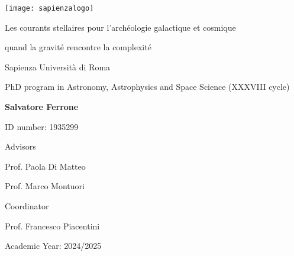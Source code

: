 \begin{titlepage}
\linespread{1}\selectfont
{}
\sffamily
\setlength{\parindent}{0pt}

\vspace*{-10mm}

\texttt{[image: sapienzalogo]}

\vspace{1cm}

\vfill

\vfill
\hspace{1.5cm}
\begin{minipage}{0.75\textwidth}
    {\LARGE\linespread{1.1}\selectfont\textcolor{sapred}{Les courants stellaires pour l'archéologie galactique et cosmique}\par}
\end{minipage}

\hspace{1.5cm}
\begin{minipage}{0.75\textwidth}
    {\large\linespread{1.1}\selectfont\textcolor{sapred}{quand la gravité rencontre la complexité}\par}
\end{minipage}

\vfill
\vfill
\vfill
\hspace{1.5cm}
\textcolor{sapred}{Sapienza Università di Roma}

\hspace{1.5cm}
\textcolor{sapred}{PhD program in Astronomy, Astrophysics and Space Science (XXXVIII cycle)}

\vfill
\hspace{1.5cm}
{\bfseries Salvatore Ferrone}

\hspace{1.5cm}
ID number: 1935299

\vfill
\hspace{1.5cm}
Advisors

\hspace{1.5cm}
Prof. Paola Di Matteo

\hspace{1.5cm}
Prof. Marco Montuori


\vfill
\hspace{1.5cm}
Coordinator

\hspace{1.5cm}
Prof. Francesco Piacentini

\vfill 

\hspace{1.5cm}
Academic Year: 2024/2025


\end{titlepage}